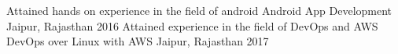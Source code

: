 \begin{cventries}
\cventry
    {Attained hands on experience in the field of android}
    {Android App Development }
    {Jaipur, Rajasthan}
    {2016}
    {
    }
  \cventry
    {Attained experience in the field of DevOps and AWS}
    {DevOps over Linux with AWS}
    {Jaipur, Rajasthan}
    {2017}
    {
    }
\end{cventries}
